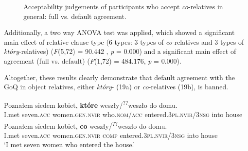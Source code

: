 \documentclass[output=paper]{langsci/langscibook}
\begin{document}
\begin{figure}
\caption{Acceptability judgements of participants who accept \textit{co}{}-relatives in general: full vs. default agreement.}
\label{fig:leska:3}
\end{figure}

Additionally, a two way ANOVA test was applied, which showed a significant main effect of relative clause type (6 types: 3 types of \textit{co}{}-relatives and 3 types of \textit{który}{}-relatives) (\textit{F}(5,72) = 90.442 , \textit{p} = 0.000) and a significant main effect of agreement (full vs. default) (\textit{F}(1,72) = 484.176, \textit{p} = 0.000).


Altogether, these results clearly demonstrate that default agreement with the GoQ in object relatives, either \textit{który}{}- (19a) or \textit{co}{}-relatives (19b), is banned. 

\ea%
    \label{ex:leska:19}
    \ea
    \gll Poznałem   siedem   kobiet,     \textbf{które} weszły/\textsuperscript{??}weszło       do   domu.\\
         I.met     seven.\textsc{acc}   women.\textsc{gen.nvir}  who.\textsc{nom/acc} entered.\textsc{3pl.nvir}/\textsc{3nsg}   into   house \\
    \ex
    \gll Poznałem   siedem   kobiet,     \textbf{co} weszły/\textsuperscript{??}weszło       do   domu.\\
          I.met     seven.\textsc{acc}   women.\textsc{gen.nvir}  \textsc{comp}     entered.\textsc{3pl.nvir}/\textsc{3nsg}   into  house        \\
    \glt ‘I met seven women who entered the house.’
    \z
\z
\end{document}
